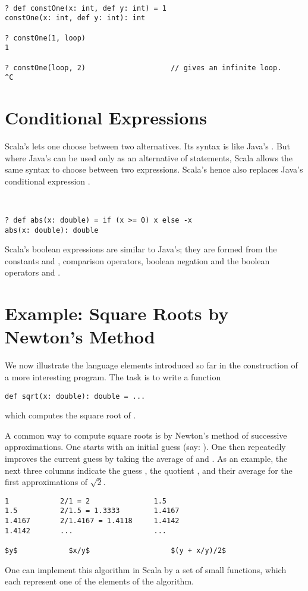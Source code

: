 \documentclass[a4paper,12pt,twoside,titlepage]{book}
\begin{document}
\example\ 
 
\begin{lstlisting}
? def constOne(x: int, def y: int) = 1
constOne(x: int, def y: int): int

? constOne(1, loop)
1

? constOne(loop, 2)                    // gives an infinite loop.
^C
\end{lstlisting}

\section{Conditional Expressions}

Scala's  lets one choose between two alternatives.  Its
syntax is like Java's . But where Java's 
can be used only as an alternative of statements, Scala allows the
same syntax to choose between two expressions. Scala's 
hence also replaces Java's conditional expression .

\example\ 

\begin{lstlisting}
? def abs(x: double) = if (x >= 0) x else -x
abs(x: double): double
\end{lstlisting}
Scala's boolean expressions are similar to Java's; they are formed
from the constants
 and
, comparison operators, boolean negation \code{!} and the
boolean operators \code{&&} and \code{||}.

\section{\label{sec:sqrt}Example: Square Roots by Newton's Method}

We now illustrate the language elements introduced so far in the
construction of a more interesting program. The task is to write a
function
\begin{lstlisting}
def sqrt(x: double): double = ... 
\end{lstlisting}
which computes the square root of .

A common way to compute square roots is by Newton's method of
successive approximations. One starts with an initial guess 
(say: ). One then repeatedly improves the current guess
 by taking the average of  and .
As an example, the next three columns indicate the guess , the
quotient , and their average for the first approximations of
$\sqrt 2$. 
\begin{lstlisting}
1            2/1 = 2               1.5
1.5          2/1.5 = 1.3333        1.4167
1.4167       2/1.4167 = 1.4118     1.4142
1.4142       ...                   ...

$y$            $x/y$                   $(y + x/y)/2$
\end{lstlisting}
One can implement this algorithm in Scala by a set of small functions,
which each represent one of the elements of the algorithm.  
\end{document}
